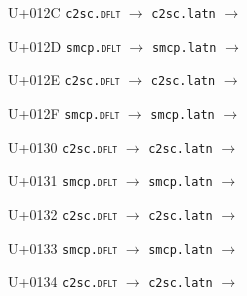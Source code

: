 \documentclass{article}
\begin{document}
\begin{substitutions}
\goodbreak

U+012C  \linebreak
    \texttt{c2sc.\textsc{dflt}} $\to$  \linebreak
    \texttt{c2sc.latn} $\to$  

\goodbreak

U+012D  \linebreak
    \texttt{smcp.\textsc{dflt}} $\to$  \linebreak
    \texttt{smcp.latn} $\to$  

\goodbreak

U+012E  \linebreak
    \texttt{c2sc.\textsc{dflt}} $\to$  \linebreak
    \texttt{c2sc.latn} $\to$  

\goodbreak

U+012F  \linebreak
    \texttt{smcp.\textsc{dflt}} $\to$  \linebreak
    \texttt{smcp.latn} $\to$  

\goodbreak

U+0130  \linebreak
    \texttt{c2sc.\textsc{dflt}} $\to$  \linebreak
    \texttt{c2sc.latn} $\to$  

\goodbreak

U+0131  \linebreak
    \texttt{smcp.\textsc{dflt}} $\to$  \linebreak
    \texttt{smcp.latn} $\to$  

\goodbreak

U+0132  \linebreak
    \texttt{c2sc.\textsc{dflt}} $\to$  \linebreak
    \texttt{c2sc.latn} $\to$  

\goodbreak

U+0133  \linebreak
    \texttt{smcp.\textsc{dflt}} $\to$  \linebreak
    \texttt{smcp.latn} $\to$  

\goodbreak

U+0134  \linebreak
    \texttt{c2sc.\textsc{dflt}} $\to$  \linebreak
    \texttt{c2sc.latn} $\to$  


\end{substitutions}
\end{document}
